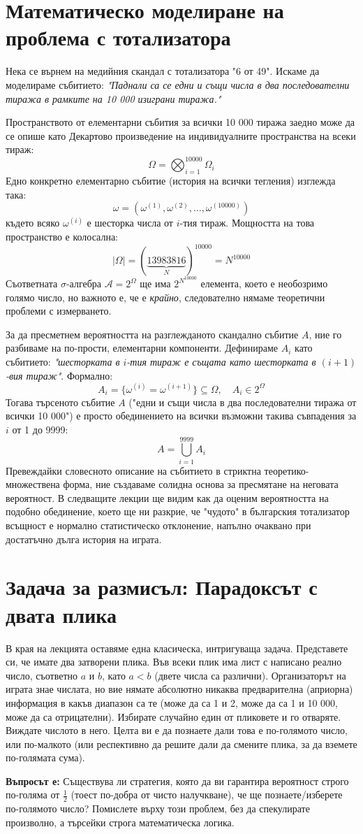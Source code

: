\documentclass{article}
\begin{document}
\section{Математическо моделиране на проблема с тотализатора}

Нека се върнем на медийния скандал с тотализатора "6 от 49". Искаме да моделираме събитието: \emph{"Паднали са се едни и същи числа в два последователни тиража в рамките на 10 000 изиграни тиража."}

Пространството от елементарни събития за всички 10 000 тиража заедно може да се опише като Декартово произведение на индивидуалните пространства на всеки тираж:
\[
\Omega = \bigotimes_{i=1}^{10000} \Omega_i
\]
Едно конкретно елементарно събитие (история на всички тегления) изглежда така:
\[
\omega = (\omega^{(1)}, \omega^{(2)}, \dots, \omega^{(10000)})
\]
където всяко $\omega^{(i)}$ е шесторка числа от $i$-тия тираж.
Мощността на това пространство е колосална:
\[
|\Omega| = (\underbrace{13983816}_{N})^{10000} = N^{10000}
\]
Съответната $\sigma$-алгебра $\mathcal{A} = 2^\Omega$ ще има $2^{N^{10000}}$ елемента, което е необозримо голямо число, но важното е, че е \emph{крайно}, следователно нямаме теоретични проблеми с измерването.

За да пресметнем вероятността на разглежданото скандално събитие $A$, ние го разбиваме на по-прости, елементарни компоненти. Дефинираме $A_i$ като събитието: \emph{"шесторката в $i$-тия тираж е същата като шесторката в $(i+1)$-вия тираж"}. 
Формално:
\[
A_i = \{ \omega^{(i)} = \omega^{(i+1)} \} \subseteq \Omega, \quad A_i \in 2^\Omega
\]
Тогава търсеното събитие $A$ ("едни и същи числа в два последователни тиража от всички 10 000") е просто обединението на всички възможни такива съвпадения за $i$ от 1 до 9999:
\[
A = \bigcup_{i=1}^{9999} A_i
\]
Превеждайки словесното описание на събитието в стриктна теоретико-множествена форма, ние създаваме солидна основа за пресмятане на неговата вероятност. В следващите лекции ще видим как да оценим вероятността на подобно обединение, което ще ни разкрие, че "чудото" в българския тотализатор всъщност е нормално статистическо отклонение, напълно очаквано при достатъчно дълга история на играта.

\section{Задача за размисъл: Парадоксът с двата плика}

В края на лекцията оставяме една класическа, интригуваща задача.
Представете си, че имате два затворени плика. Във всеки плик има лист с написано реално число, съответно $a$ и $b$, като $a < b$ (двете числа са различни). Организаторът на играта знае числата, но вие нямате абсолютно никаква предварителна (априорна) информация в какъв диапазон са те (може да са 1 и 2, може да са 1 и 10 000, може да са отрицателни).
Избирате случайно един от пликовете и го отваряте. Виждате числото в него. Целта ви е да познаете дали това е по-голямото число, или по-малкото (или респективно да решите дали да смените плика, за да вземете по-голямата сума). 

\textbf{Въпросът е:} Съществува ли стратегия, която да ви гарантира вероятност строго по-голяма от $\frac{1}{2}$ (тоест по-добра от чисто налучкване), че ще познаете/изберете по-голямото число?
Помислете върху този проблем, без да спекулирате произволно, а търсейки строга математическа логика.
\end{document}
